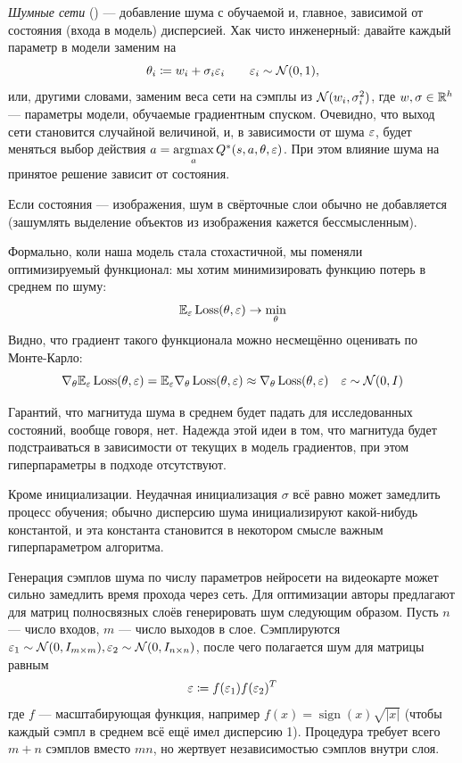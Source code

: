 \emph{Шумные сети} () --- добавление шума с обучаемой и, главное, зависимой от состояния (входа в модель) дисперсией. Хак чисто инженерный: давайте каждый параметр в модели заменим на
$$\theta_i \coloneqq w_i + \sigma_i \varepsilon_i \qquad \varepsilon_i \sim \mathcal{N}(0, 1),$$
или, другими словами, заменим веса сети на сэмплы из $\mathcal{N}(w_i, \sigma^2_i)$, где $w, \sigma \in \mathbb{R}^h$ --- параметры модели, обучаемые градиентным спуском. Очевидно, что выход сети становится случайной величиной, и, в зависимости от шума $\varepsilon$, будет меняться выбор действия $a \HM= \argmax\limits_a Q^*(s, a, \theta, \eps)$. При этом влияние шума на принятое решение зависит от состояния.

\begin{remark}
Если состояния --- изображения, шум в свёрточные слои обычно не добавляется (зашумлять выделение объектов из изображения кажется бессмысленным).
\end{remark}

Формально, коли наша модель стала стохастичной, мы поменяли оптимизируемый функционал: мы хотим минимизировать функцию потерь в среднем по шуму:
$$\mathbb{E}_{\varepsilon} \operatorname{Loss}(\theta, \varepsilon) \to \min_\theta$$
Видно, что градиент такого функционала можно несмещённо оценивать по Монте-Карло:
$$\nabla_\theta \mathbb{E}_{\varepsilon} \operatorname{Loss}(\theta, \varepsilon) = \mathbb{E}_{\varepsilon} \nabla_\theta \operatorname{Loss}(\theta, \varepsilon) \approx \nabla_\theta \operatorname{Loss}(\theta, \varepsilon) \quad \varepsilon \sim \mathcal{N}(0, I)$$

Гарантий, что магнитуда шума в среднем будет падать для исследованных состояний, вообще говоря, нет. Надежда этой идеи в том, что магнитуда будет подстраиваться в зависимости от текущих в модель градиентов, при этом гиперпараметры в подходе отсутствуют.
\begin{remark}
Кроме инициализации. Неудачная инициализация $\sigma$ всё равно может замедлить процесс обучения; обычно дисперсию шума инициализируют какой-нибудь константой, и эта константа становится в некотором смысле важным гиперпараметром алгоритма.
\end{remark}

\begin{remark}
Генерация сэмплов шума по числу параметров нейросети на видеокарте может сильно замедлить время прохода через сеть. Для оптимизации авторы предлагают для матриц полносвязных слоёв генерировать шум следующим образом. Пусть $n$ --- число входов, $m$ --- число выходов в слое. Сэмплируются $\varepsilon_1 \sim \mathcal{N}(0, I_{m \times m}), \varepsilon_2 \sim \mathcal{N}(0, I_{n \times n})$, после чего полагается шум для матрицы равным
$$\varepsilon \coloneqq f(\varepsilon_1) f(\varepsilon_2)^T$$
где $f$ --- масштабирующая функция, например $f(x) = \operatorname{sign}(x)\sqrt{|x|}$ (чтобы каждый сэмпл в среднем всё ещё имел дисперсию 1). Процедура требует всего $m + n$ сэмплов вместо $mn$, но жертвует независимостью сэмплов внутри слоя.
\end{remark}

